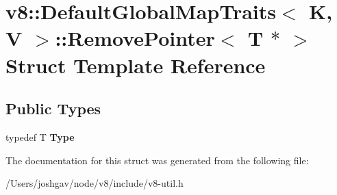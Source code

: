 \hypertarget{structv8_1_1_default_global_map_traits_1_1_remove_pointer_3_01_t_01_5_01_4}{}\section{v8\+:\+:Default\+Global\+Map\+Traits$<$ K, V $>$\+:\+:Remove\+Pointer$<$ T $\ast$ $>$ Struct Template Reference}
\label{structv8_1_1_default_global_map_traits_1_1_remove_pointer_3_01_t_01_5_01_4}
\subsection*{Public Types}
\begin{DoxyCompactItemize}
\item 
typedef T {\bfseries Type}\hypertarget{structv8_1_1_default_global_map_traits_1_1_remove_pointer_3_01_t_01_5_01_4_a8c940cb440e64fc01237ab0e1a976b9f}{}\label{structv8_1_1_default_global_map_traits_1_1_remove_pointer_3_01_t_01_5_01_4_a8c940cb440e64fc01237ab0e1a976b9f}

\end{DoxyCompactItemize}


The documentation for this struct was generated from the following file\+:\begin{DoxyCompactItemize}
\item 
/\+Users/joshgav/node/v8/include/v8-\/util.\+h\end{DoxyCompactItemize}
